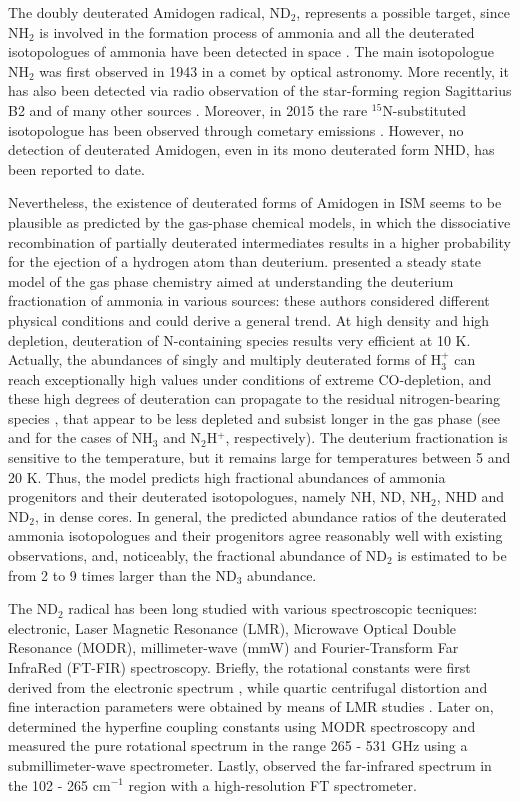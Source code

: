 \documentclass[twocolumn]{aastex61}
\begin{document}
The doubly deuterated Amidogen radical, ND$_{2}$, represents a possible target, since NH$_2$ is involved in the formation process 
of ammonia \citep{Her87} and all the deuterated isotopologues of ammonia have been detected in space 
\citep{Tur78, Rou00, Lis02}.
The main isotopologue NH$_{2}$ was first observed in 1943 in a comet \citep{Swi43} by optical astronomy.
More recently, it has also been detected via radio observation of the star-forming region Sagittarius B2 \citep{van93} and of many 
other sources \citep{Hil10, Per10}.
Moreover, in 2015 the rare $^{15}$N-substituted isotopologue has been observed through cometary emissions \citep{Rou14, Shi14}.
However, no detection of deuterated Amidogen, even in its mono deuterated form NHD, has been reported to date.

Nevertheless, the existence of deuterated forms of Amidogen in ISM seems to be plausible as predicted by the gas-phase chemical models, in which the dissociative recombination of partially deuterated intermediates results in a higher probability for the ejection of 
a  hydrogen atom than deuterium.
\citet{Rou05} presented a steady state model of the gas phase chemistry aimed at understanding the deuterium fractionation of ammonia in various sources: these authors considered different physical conditions and could derive a general trend.
At high density and high depletion, deuteration of N-containing species results very efficient at 10 K.
Actually, the abundances of singly and multiply deuterated
forms of H$_3^+$ can reach exceptionally high values under conditions of extreme CO-depletion, and
these high degrees of deuteration can propagate to the residual nitrogen-bearing species \citep{Flo06}, that appear to be less depleted
and subsist longer in the gas phase (see \citet{Ber97} and \citet{Bel04} for the cases of NH$_3$ and N$_2$H$^+$, respectively).
The deuterium fractionation is sensitive to the temperature, but it remains large for temperatures between 5 and 20 K.
Thus, the model predicts high fractional abundances of ammonia progenitors and their deuterated isotopologues, namely NH, ND, NH$_{2}$, 
NHD and ND$_{2}$, in dense cores.
In general, the predicted abundance ratios of the deuterated ammonia isotopologues and their progenitors agree reasonably well with existing observations, and, noticeably, the fractional abundance of ND$_{2}$ is estimated to be from 2 to 9 times larger than the ND$_3$ abundance.

The ND$_{2}$ radical has been long studied with various spectroscopic tecniques: electronic, Laser Magnetic Resonance (LMR),
Microwave Optical Double Resonance (MODR), millimeter-wave (mmW) and Fourier-Transform Far InfraRed (FT-FIR) spectroscopy.
Briefly, the rotational constants were first derived from the electronic spectrum \citep{Dre59}, while quartic centrifugal 
distortion and fine interaction parameters were obtained by means of LMR studies \citep{Hil79}.
Later on, \citet{Coo83} determined the hyperfine coupling constants using MODR spectroscopy and \citet{Kan91} measured the 
pure rotational spectrum in the range 265 - 531 GHz using a submillimeter-wave spectrometer.
Lastly, \citet{Mor97} observed the far-infrared spectrum in the 102 - 265 cm$^{-1}$ region with a high-resolution FT spectrometer.
\end{document}
